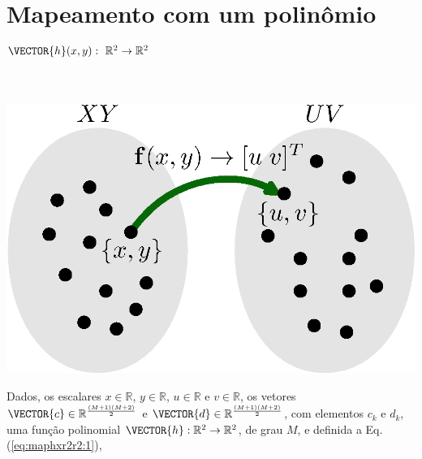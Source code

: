 \section{ Mapeamento com um polinômio $\VECTOR{h}(x,y):~\mathbb{R}^2 \rightarrow \mathbb{R}^2$}


\begin{theorem}
\label{theo:maphxr2r2}
~\\
\begin{minipage}{0.45\textwidth}
\centering
\includegraphics[width=0.95\linewidth]{chapters/mapeamento/mapeamento.eps} 
\end{minipage}
\begin{minipage}{0.55\textwidth}
Dados,
os escalares 
$x \in \mathbb{R}$, 
$y \in \mathbb{R}$, 
$u \in \mathbb{R}$ e 
$v \in \mathbb{R}$,
os vetores $\VECTOR{c} \in \mathbb{R}^{\frac{(M+1)(M+2)}{2}}$ e
$\VECTOR{d} \in \mathbb{R}^{\frac{(M+1)(M+2)}{2}}$,
com elementos $c_k$ e $d_k$,
uma função polinomial $\VECTOR{h}:\mathbb{R}^2 \rightarrow \mathbb{R}^2$, de grau $M$, e 
definida a Eq. (\ref{eq:maphxr2r2:1}),
\begin{equation}\label{eq:maphxr2r2:1}

\end{equation}
\end{minipage}
\end{theorem}
